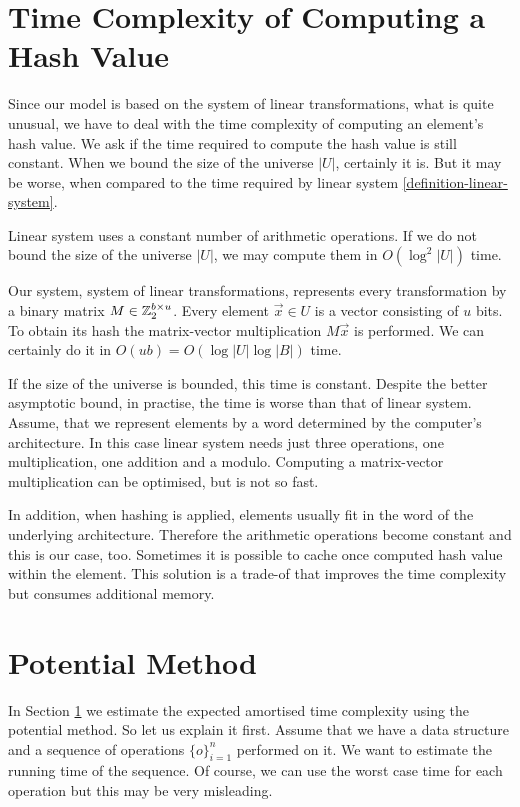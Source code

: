 \section{Time Complexity of Computing a Hash Value}
\label{section-time-complexity}
Since our model is based on the system of linear transformations, what is quite unusual, we have to deal with the time complexity of computing an element's hash value. We ask if the time required to compute the hash value is still constant. When we bound the size of the universe $|U|$, certainly it is. But it may be worse, when compared to the time required by linear system \ref{definition-linear-system}. 

Linear system uses a constant number of arithmetic operations. If we do not bound the size of the universe $|U|$, we may compute them in $O(\log^2 |U|)$ time. 

Our system, system of linear transformations, represents every transformation by a binary matrix $M \in \mathbb{Z}_{2}^{b \times u}$. Every element $\vec{x} \in U$ is a vector consisting of $u$ bits. To obtain its hash the matrix-vector multiplication $M\vec{x}$ is performed. We can certainly do it in $O(u b) = O(\log |U| \log |B|)$ time. 

If the size of the universe is bounded, this time is constant. Despite the better asymptotic bound, in practise, the time is worse than that of linear system. Assume, that we represent elements by a word determined by the computer's architecture. In this case linear system needs just three operations, one multiplication, one addition and a modulo. Computing a matrix-vector multiplication can be optimised, but is not so fast. 

In addition, when hashing is applied, elements usually fit in the word of the underlying architecture. Therefore the arithmetic operations become constant and this is our case, too. Sometimes it is possible to cache once computed hash value within the element. This solution is a trade-of that improves the time complexity but consumes additional memory.

\section{Potential Method} 
In Section \ref{section-time-complexity} we estimate the expected amortised time complexity using the potential method. So let us explain it first. Assume that we have a data structure and a sequence of operations $\{o\}_{i = 1}^{n}$ performed on it. We want to estimate the running time of the sequence. Of course, we can use the worst case time for each operation but this may be very misleading. 

